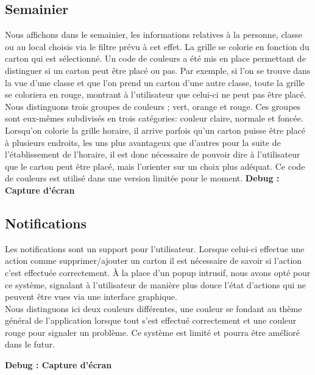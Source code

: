 \subsection{Semainier}
Nous affichons dans le semainier, les informations relatives à la personne, classe ou au local choisis via le filtre prévu à cet effet. La grille se colorie en fonction du carton qui est sélectionné. Un code de couleurs a été mis en place permettant de distinguer si un carton peut être placé ou pas. Par exemple, si l'on se trouve dans la vue d'une classe et que l'on prend un carton d'une autre classe, toute la grille se coloriera en rouge, montrant à l'utilisateur que celui-ci ne peut pas être placé.\\
\newline
\indent
Nous distinguons trois groupes de couleurs ; vert, orange et rouge. Ces groupes sont eux-mêmes subdivisés en trois catégories: couleur claire, normale et foncée. Lorsqu'on colorie la grille horaire, il arrive parfois qu'un carton puisse être placé à plusieurs endroits, les uns plus avantageux que d'autres pour la suite de l'établissement de l'horaire, il est donc nécessaire de pouvoir dire à l'utilisateur que le carton peut être placé, mais l'orienter sur un choix plus adéquat. Ce code de couleurs est utilisé dans une version limitée pour le moment.
\bigskip
\textbf{Debug : Capture d'écran}


\subsection{Notifications}
Les notifications sont un support pour l'utilisateur. Lorsque celui-ci effectue une action comme supprimer/ajouter un carton il est nécessaire de savoir si l'action c'est effectuée correctement. À la place d'un popup intrusif, nous avons opté pour ce système, signalant à l'utilisateur de manière plus douce l'état d'actions qui ne peuvent être vues via une interface graphique.\\
\newline
\indent
Nous distinguons ici deux couleurs différentes, une couleur se fondant au thème général de l'application lorsque tout s'est effectué correctement et une couleur rouge pour signaler un problème. Ce système est limité et pourra être amélioré dans le futur.\\
\newline
\indent

\textbf{Debug : Capture d'écran}


